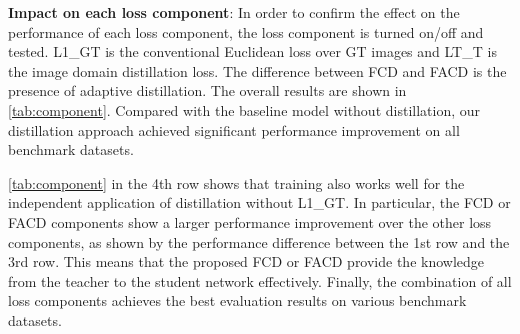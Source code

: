 \documentclass[10pt,twocolumn,letterpaper]{article}
\begin{document}
\noindent \textbf{Impact on each loss component}: In order to confirm the effect on the performance of each loss component, the loss component is turned on/off and tested. L1\_GT is the conventional Euclidean loss over GT images and LT\_T is the image domain distillation loss. The difference between FCD and FACD is the presence of adaptive distillation. The overall results are shown in \cref{tab:component}. Compared with the baseline model without distillation, our distillation approach achieved significant performance improvement on all benchmark datasets. 

\cref{tab:component} in the 4th row shows that training also works well for the independent application of distillation without L1\_GT. In particular, the FCD or FACD components show a larger performance improvement over the other loss components, as shown by the performance difference between the 1st row and the 3rd row. This means that the proposed FCD or FACD provide the knowledge from the teacher to the student network effectively. Finally, the combination of all loss components achieves the best evaluation results on various benchmark datasets.

\begin{table}[h]
\caption{Ablation study (PSNR) on the effectiveness of each loss component in the RCAN network (x4). The best performance is marked in \textbf{bold}.}
\label{tab:component}
\end{table}
\end{document}

